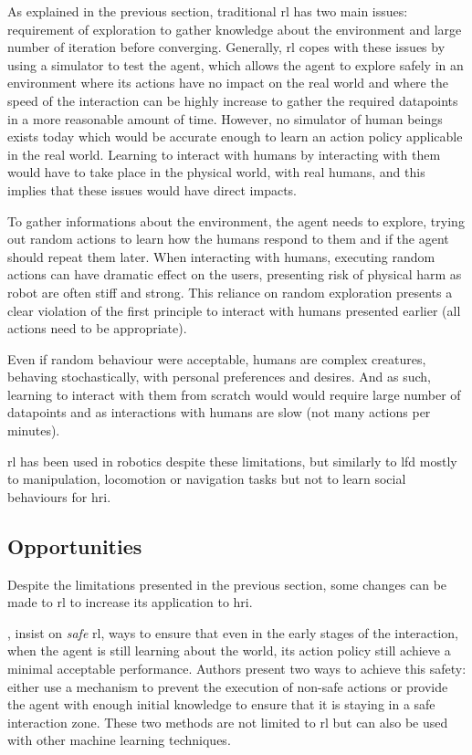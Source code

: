	As explained in the previous section, traditional \gls{rl} has two main issues: requirement of exploration to gather knowledge about the environment and large number of iteration before converging. Generally, \gls{rl} copes with these issues by using a simulator to test the agent, which allows the agent to explore safely in an environment where its actions have no impact on the real world and where the speed of the interaction can be highly increase to gather the required datapoints in a more reasonable amount of time. However, no simulator of human beings exists today which would be accurate enough to learn an action policy applicable in the real world. Learning to interact with humans by interacting with them would have to take place in the physical world, with real humans, and this implies that these issues would have direct impacts. 
	
	To gather informations about the environment, the agent needs to explore, trying out random actions to learn how the humans respond to them and if the agent should repeat them later. When interacting with humans, executing random actions can have dramatic effect on the users, presenting risk of physical harm as robot are often stiff and strong. This reliance on random exploration presents a clear violation of the first principle to interact with humans presented earlier (all actions need to be appropriate).
	
	Even if random behaviour were acceptable, humans are complex creatures, behaving stochastically, with personal preferences and desires. And as such, learning to interact with them from scratch would would require large number of datapoints and as interactions with humans are slow (not many actions per minutes). 
	
	\gls{rl} has been used in robotics despite these limitations\citep{kober2013reinforcement}, but similarly to \gls{lfd} mostly to manipulation, locomotion or navigation tasks but not to learn social behaviours for \gls{hri}. 
	
	
\subsection{Opportunities}  
	Despite the limitations presented in the previous section, some changes can be made to \gls{rl} to increase its application to \gls{hri}.
	  
	\cite{garcia2015comprehensive}, insist on \textit{safe} \gls{rl}, ways to ensure that even in the early stages of the interaction, when the agent is still learning about the world, its action policy still achieve a minimal acceptable performance. Authors present two ways to achieve this safety: either use a mechanism to prevent the execution of non-safe actions or provide the agent with enough initial knowledge to ensure that it is staying in a safe interaction zone. These two methods are not limited to \gls{rl} but can also be used with other machine learning techniques. 
	
